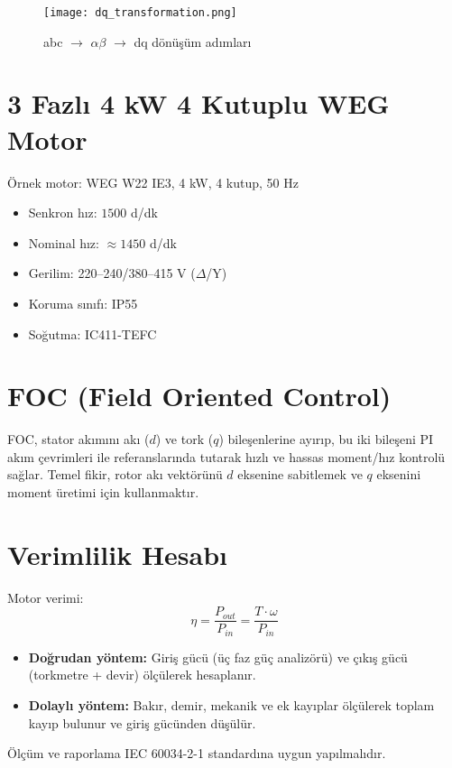 \begin{figure}[H]
    \centering
    \texttt{[image: dq\_transformation.png]}
    \caption{abc $\rightarrow$ $\alpha\beta$ $\rightarrow$ dq dönüşüm adımları}
    \label{fig:dq_transformation}
\end{figure}


\section{3 Fazlı 4 kW 4 Kutuplu WEG Motor} Örnek motor: WEG W22 IE3, 4 kW, 4 kutup, 50 Hz \begin{itemize} \item Senkron hız: $1500$ d/dk \item Nominal hız: $\approx 1450$ d/dk \item Gerilim: 220–240/380–415 V ($\Delta$/Y) \item Koruma sınıfı: IP55 \item Soğutma: IC411-TEFC \end{itemize} 

\section{FOC (Field Oriented Control)} FOC, stator akımını akı ($d$) ve tork ($q$) bileşenlerine ayırıp, bu iki bileşeni PI akım çevrimleri ile referanslarında tutarak hızlı ve hassas moment/hız kontrolü sağlar. Temel fikir, rotor akı vektörünü $d$ eksenine sabitlemek ve $q$ eksenini moment üretimi için kullanmaktır. 

\section{Verimlilik Hesabı} Motor verimi: \begin{equation} \eta = \frac{P_{out}}{P_{in}} = \frac{T \cdot \omega}{P_{in}} \end{equation} \begin{itemize} \item \textbf{Doğrudan yöntem:} Giriş gücü (üç faz güç analizörü) ve çıkış gücü (torkmetre + devir) ölçülerek hesaplanır. \item \textbf{Dolaylı yöntem:} Bakır, demir, mekanik ve ek kayıplar ölçülerek toplam kayıp bulunur ve giriş gücünden düşülür. \end{itemize} Ölçüm ve raporlama IEC 60034-2-1 standardına uygun yapılmalıdır.
 
\medskip




\clearpage

